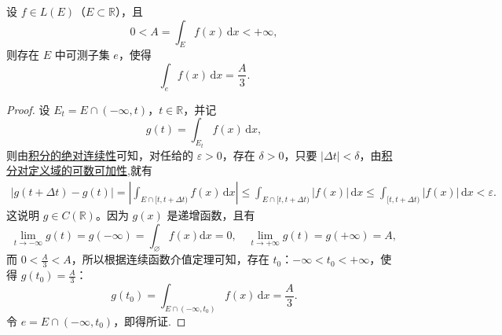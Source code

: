 \documentclass[../../main.tex]{subfiles}%
\begin{document}
\begin{corollary}
设 $f \in L(E)$（$E \subset \mathbb{R}$），且
\[
0 < A = \int_E f(x) \, \mathrm{d}x < +\infty,
\]
则存在 $E$ 中可测子集 $e$，使得
\[
\int_e f(x) \, \mathrm{d}x = \frac{A}{3}.
\]
\end{corollary}
\begin{proof}
设 $E_t = E \cap (-\infty, t)$，$t \in \mathbb{R}$，并记
\[
g(t) = \int_{E_t} f(x) \, \mathrm{d}x,
\]
则由\hyperref[theorem:积分的绝对连续性]{积分的绝对连续性}可知，对任给的 $\varepsilon > 0$，存在 $\delta > 0$，只要 $|\Delta t| < \delta$，由\hyperref[theorem:积分对定义域的可数可加性]{积分对定义域的可数可加性},就有
\begin{align*}
|g(t+\Delta t)-g(t)|=\left| \int_{E\cap [t,t+\Delta t)}{f\left( x \right) \,\mathrm{d}x} \right|\leqslant \int_{E\cap [t,t+\Delta t)}{|f(x)|\,\mathrm{d}x}\leqslant \int_{[t,t+\Delta t)}{|f(x)|\,\mathrm{d}x}<\varepsilon .
\end{align*}
这说明 $g \in C(\mathbb{R})$。因为 $g(x)$ 是递增函数，且有
\[
\lim_{t\rightarrow -\infty} g(t)=g\left( -\infty \right) =\int_{\varnothing}{f\left( x \right) \mathrm{d}x}=0,\quad \lim_{t\rightarrow +\infty} g(t)=g\left( +\infty \right) =A,
\]
而 $0 < \frac{A}{3} < A$，所以根据连续函数介值定理可知，存在 $t_0$：$-\infty < t_0 < +\infty$，使得 $g(t_0) = \frac{A}{3}$：
\[
g(t_0) = \int_{E \cap (-\infty, t_0)} f(x) \, \mathrm{d}x = \frac{A}{3}.
\]
令 $e = E \cap (-\infty, t_0)$，即得所证.
\end{proof}
\end{document}
